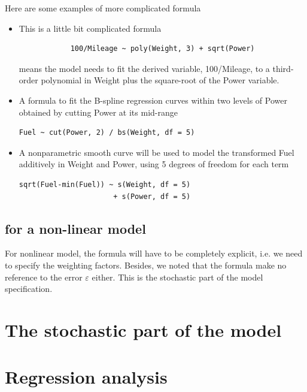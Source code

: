 Here are some examples of more complicated formula
\begin{itemize}
\item This is a little bit complicated formula
\begin{verbatim}
            100/Mileage ~ poly(Weight, 3) + sqrt(Power)
\end{verbatim}
  means the model needs to fit the derived variable, 100/Mileage, to a
  third-order polynomial in Weight plus the square-root of the Power
  variable.

\item A formula to fit the B-spline regression curves within two
  levels of Power obtained by cutting Power at its mid-range
\begin{verbatim}
Fuel ~ cut(Power, 2) / bs(Weight, df = 5)
\end{verbatim}

\item A nonparametric smooth curve will be used to model the
  transformed Fuel additively in Weight and Power, using 5 degrees of
  freedom for each term
\begin{verbatim}
sqrt(Fuel-min(Fuel)) ~ s(Weight, df = 5) 
                      + s(Power, df = 5)
\end{verbatim}
\end{itemize}


\subsection{for a non-linear model}
\label{sec:non-linear-model}

For nonlinear model, the formula will have to be completely explicit,
i.e. we need to specify the weighting factors. Besides, we noted that
the formula make no reference to the error $\varepsilon$ either. This
is the stochastic part of the model specification.

\section{The stochastic part of the model}
\label{sec:stoch-part-model}




\section{Regression analysis}
\label{sec:regression_analysis}

